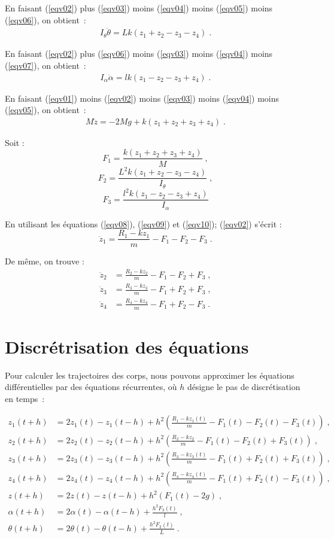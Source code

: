 \documentclass[a4paper,11pt]{amsart}
\begin{document}
En faisant (\ref{eqv02}) plus (\ref{eqv03}) moins
(\ref{eqv04}) moins (\ref{eqv05}) moins (\ref{eqv06}), on obtient~:
\begin{align}
\label{eqv08} I_{\theta}\ddot{\theta} = Lk(z_1+z_2-z_3-z_4)\;.
\end{align}

En faisant (\ref{eqv02}) plus (\ref{eqv06}) moins
(\ref{eqv03}) moins (\ref{eqv04}) moins (\ref{eqv07}), on obtient~:
\begin{align}
\label{eqv09} I_{\alpha}\ddot{\alpha} = lk(z_1-z_2-z_3+z_4)\;.
\end{align}

En faisant (\ref{eqv01}) moins (\ref{eqv02}) moins (\ref{eqv03}) moins
(\ref{eqv04}) moins (\ref{eqv05}), on obtient~:
\begin{align}
\label{eqv10} M\ddot{z}=-2Mg+k(z_1+z_2+z_3+z_4)\;.
\end{align}


Soit :
$$F_1=\frac{k(z_1+z_2+z_3+z_4)}{M}\;,$$
$$F_2=\frac{L^2k(z_1+z_2-z_3-z_4)}{I_{\theta}}\;,$$
$$F_3=\frac{l^2k(z_1-z_2-z_3+z_4)}{I_{\alpha}}$$

En utilisant les \'equations (\ref{eqv08}), (\ref{eqv09}) et 
(\ref{eqv10}); (\ref{eqv02}) 
s'\'ecrit :
$$\ddot{z}_1 = 
\frac{R_1-kz_1}{m}-F_1-F_2-F_3\;.$$

De m\^eme, on trouve :
\begin{align*}
\ddot{z}_2 &= 
\frac{R_2-kz_2}{m}-F_1-F_2+F_3\;,\\
\ddot{z}_3 &= 
\frac{R_3-kz_3}{m}-F_{1}+F_2+F_3\;,\\
\ddot{z}_4 &= 
\frac{R_4-kz_4}{m}-F_1+F_2-F_3\;.
\end{align*}

\section{Discr\'etrisation des \'equations}

Pour calculer les trajectoires des corps, nous pouvons approximer
les \'equations diff\'erentielles par des
\'equations r\'ecurrentes, o\`u $h$ d\'esigne le pas de discr\'etisation en temps~:

\begin{align*}
z_1(t+h) &= 2z_1(t)-z_1(t-h)+h^2\left 
(\frac{R_1-kz_1(t)}{m}-F_1(t)-F_2(t)-F_3(t) \right ) \;,\\
z_2(t+h) &= 2z_2(t)-z_2(t-h)+h^2\left 
(\frac{R_2-kz_2}{m}-F_1(t)-F_2(t)+F_3(t)  \right )\;,\\
z_3(t+h) &= 2z_3(t)-z_3(t-h)+h^2\left 
(\frac{R_3-kz_3(t)}{m}-F_1(t)+F_2(t)+F_3(t)  \right )\;,\\
z_4(t+h) &= 2z_4(t)-z_4(t-h)+h^2\left 
(\frac{R_4-kz_4(t)}{m}-F_1(t)+F_2(t)-F_3(t)  \right )\;,\\
z(t+h) &= 2z(t)-z(t-h)+h^2\left (
F_1(t)-2g\right )\;,\\
\alpha (t+h) &= 2\alpha (t)-\alpha (t-h)+ \frac{h^2 F_3(t)}{l}\;,\\
\theta (t+h) &= 2\theta (t)-\theta (t-h)+ \frac{h^2 F_2(t)}{L}\;.
\end{align*}
\end{document}
